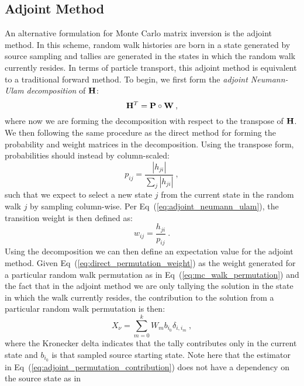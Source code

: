 \subsection{Adjoint Method}
\label{subsec:adjoint_mc}
An alternative formulation for Monte Carlo matrix inversion is the
adjoint method. In this scheme, random walk histories are born in a
state generated by source sampling and tallies are generated in the
states in which the random walk currently resides. In terms of
particle transport, this adjoint method is equivalent to a traditional
forward method. To begin, we first form the \textit{adjoint
  Neumann-Ulam decomposition} of $\mathbf{H}$:
\begin{equation}
  \mathbf{H}^T = \mathbf{P} \circ \mathbf{W}\:,
  \label{eq:adjoint_neumann_ulam}
\end{equation}
where now we are forming the decomposition with respect to the
transpose of $\mathbf{H}$. We then following the same procedure as the
direct method for forming the probability and weight matrices in the
decomposition. Using the transpose form, probabilities should instead
by column-scaled:
\begin{equation}
  p_{ij} = \frac{|h_{ji}|}{\sum_j |h_{ji}|}\:,
  \label{eq:adjoint_probability}
\end{equation}
such that we expect to select a new state $j$ from the current state
in the random walk $j$ by sampling column-wise. Per
Eq~(\ref{eq:adjoint_neumann_ulam}), the transition weight is then
defined as:
\begin{equation}
  w_{ij} = \frac{h_{ji}}{p_{ij}}\:.
  \label{eq:adjoint_weight}
\end{equation}
Using the decomposition we can then define an expectation value for
the adjoint method. Given Eq~(\ref{eq:direct_permutation_weight}) as
the weight generated for a particular random walk permutation as in
Eq~(\ref{eq:mc_walk_permutation}) and the fact that in the adjoint
method we are only tallying the solution in the state in which the
walk currently resides, the contribution to the solution from a
particular random walk permutation is then:
\begin{equation}
  X_{\nu} = \sum_{m=0}^k W_{m} b_{i_0} \delta_{i,i_m}\:,
  \label{eq:adjoint_permutation_contribution}
\end{equation}
where the Kronecker delta indicates that the tally contributes only in
the current state and $b_{i_0}$ is that sampled source starting
state. Note here that the estimator in
Eq~(\ref{eq:adjoint_permutation_contribution}) does not have a
dependency on the source state as in
